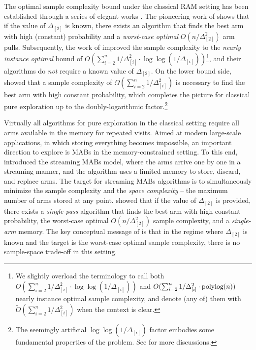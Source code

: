 The optimal sample complexity bound under the classical RAM setting has been established 
through a series of elegant works \cite{Even-Dar+02,MannorTs04,KarninKS13,JamiesonMNB14}. The pioneering work of \cite{Even-Dar+02} shows that if the value of $\Delta_{[2]}$ is known, there exists an algorithm that finds the best arm with high (constant) probability and a \emph{worst-case optimal} $O(n/\Delta^2_{[2]})$ arm pulls. Subsequently, the work of \cite{KarninKS13,JamiesonMNB14} improved the sample complexity to the \emph{nearly instance optimal} bound of $O(\sum_{i=2}^{n}1/\Delta^2_{[i]}\cdot \log\log(1/\Delta_{[i]}))$\footnote{We slightly overload the terminology to call both $O(\sum_{i=2}^{n}1/\Delta^2_{[i]}\cdot \log\log(1/\Delta_{[i]}))$ and $O(\sum_{i=2}^{n}1/\Delta^2_{[i]}\cdot \textnormal{polylog}{(n)})$ nearly instance optimal sample complexity, and denote (any of) them with $\tilde{O}(\sum_{i=2}^{n}1/\Delta^2_{[i]})$ when the context is clear.}, and their algorithms do \emph{not} require a known value of $\Delta_{[2]}$. On the lower bound side, \cite{MannorTs04} showed that a sample complexity of $\Omega(\sum_{i=2}^{n}1/\Delta^2_{[i]})$ is necessary to find the best arm with high constant probability, which completes the picture for classical pure exploration up to the doubly-logarithmic factor.\footnote{The seemingly artificial $\log\log(1/\Delta_{[i]})$ factor embodies some fundamental properties of the problem. See \cite{ChenL16,CLQ17} for more discussions.} %

Virtually all algorithms for pure exploration in the classical setting require all arms available in the memory for repeated visits. Aimed at modern large-scale applications, in which storing everything becomes impossible, an important direction to explore is MABs in the memory-constrained setting. To this end, \cite{AssadiW20} introduced the streaming MABs model, where the arms arrive one by one in a streaming manner, and the algorithm uses a limited memory to store, discard, and replace arms. The target for streaming MABs algorithms is to simultaneously minimize the sample complexity and the \emph{space complexity} -- the maximum number of arms stored at any point. \cite{AssadiW20} showed that if the value of $\Delta_{[2]}$ is provided, there exists a \emph{single-pass} algorithm that finds the best arm with high constant probability, the worst-case optimal $O(n/\Delta^2_{[2]})$ sample complexity, and a \emph{single-arm} memory. The key conceptual message of \cite{AssadiW20} is that in the regime where $\Delta_{[2]}$ is known and the target is the worst-case optimal sample complexity, there is no sample-space trade-off in this setting.


